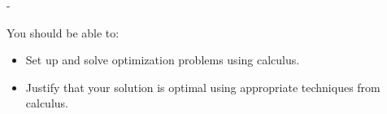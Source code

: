 \documentclass{article}
\makeatletter
\newlength{\tipmargin}
\renewenvironment{framed}{
  \setlength{\tipmargin}{\textwidth-\linewidth}
  \advance\@totalleftmargin-\tipmargin
  \def\FrameCommand{\hspace{\tipmargin}\fbox}%
  \advance\linewidth\tipmargin
  \MakeFramed {\advance\hsize-\width \FrameRestore}%
}
{\endMakeFramed}
\makeatother
\begin{document}

\begin{problemonly}
  \begin{framed}

You should be able to:
    \begin{itemize}[topsep=0pt,partopsep=0pt,parsep=8pt,itemsep=0pt]
    \item Set up and solve optimization problems using calculus.

    \item Justify that your solution is optimal using appropriate techniques from calculus.

    \end{itemize}
  \end{framed}
\end{problemonly}
\end{document}
